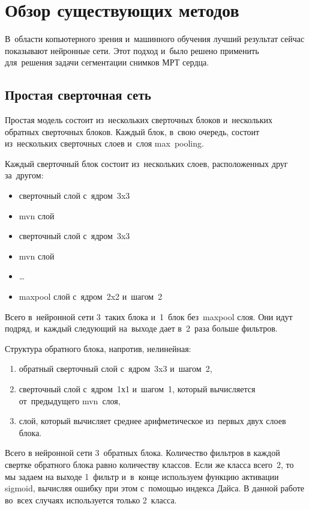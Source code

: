 \section{Обзор существующих методов}

В~области копьютерного зрения и~машинного обучения лучший результат сейчас показывают нейронные сети. Этот подход и~было решено применить для~решения задачи сегментации снимков МРТ сердца.

\subsection{Простая сверточная сеть}
 
Простая модель состоит из~нескольких сверточных блоков и~нескольких обратных сверточных блоков. Каждый блок, в~свою очередь, состоит из~нескольких сверточных слоев и~слоя max~pooling. 

Каждый сверточный блок состоит из~нескольких слоев, расположенных друг за~другом:

\begin{itemize}
  \item сверточный слой с~ядром~3x3
  \item mvn слой
  \item сверточный слой с~ядром~3x3
  \item mvn слой
  \item \dots
  \item maxpool слой с~ядром~2x2 и~шагом~2
\end{itemize}

Всего в~нейронной сети 3~таких блока и~1~блок без~maxpool слоя. Они идут подряд, и~каждый следующий на~выходе дает в~2~раза больше фильтров. 

Структура обратного блока, напротив, нелинейная:

\begin{enumerate}
  \item обратный сверточный слой с~ядром~3x3 и~шагом~2,
  \item сверточный слой с~ядром~1х1 и~шагом~1, который вычисляется от~предыдущего mvn~слоя,
  \item слой, который вычисляет среднее арифметическое из~первых двух слоев блока.
\end{enumerate}

Всего в нейронной сети 3~обратных блока. Количество фильтров в каждой свертке обратного блока равно количеству классов. Если же класса всего~2, то мы задаем на выходе 1~фильтр и~в~конце используем функцию активации sigmoid, вычисляя ошибку при этом с~помощью индекса Дайса. В данной работе во~всех случаях используется только 2~класса.

